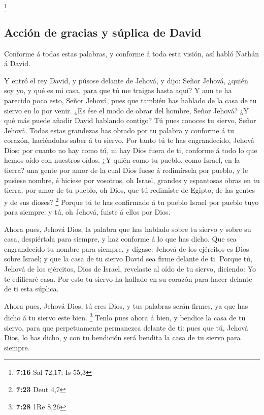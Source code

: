 \footnote{\textbf{7:16} Sal 72,17; Is 55,3}

\hypertarget{acciuxf3n-de-gracias-y-suxfaplica-de-david}{%
\subsection{Acción de gracias y súplica de
David}\label{acciuxf3n-de-gracias-y-suxfaplica-de-david}}

 Conforme á todas estas palabras, y conforme á toda esta
visión, así habló Nathán á David.

 Y entró el rey David, y púsose delante de Jehová, y
dijo: Señor Jehová, ¿quién soy yo, y qué es mi casa, para que tú me
traigas hasta aquí?  Y aun te ha parecido poco esto,
Señor Jehová, pues que también has hablado de la casa de tu siervo en lo
por venir. ¿Es ése el modo de obrar del hombre, Señor Jehová?
 ¿Y qué más puede añadir David hablando contigo? Tú pues
conoces tu siervo, Señor Jehová.  Todas estas grandezas
has obrado por tu palabra y conforme á tu corazón, haciéndolas saber á
tu siervo.  Por tanto tú te has engrandecido, Jehová
Dios: por cuanto no hay como tú, ni hay Dios fuera de ti, conforme á
todo lo que hemos oído con nuestros oídos.  ¿Y quién como
tu pueblo, como Israel, en la tierra? una gente por amor de la cual Dios
fuese á redimírsela por pueblo, y le pusiese nombre, é hiciese por
vosotros, oh Israel, grandes y espantosas obras en tu tierra, por amor
de tu pueblo, oh Dios, que tú redimiste de Egipto, de las gentes y de
sus dioses? \footnote{\textbf{7:23} Deut 4,7}  Porque tú
te has confirmado á tu pueblo Israel por pueblo tuyo para siempre: y tú,
oh Jehová, fuiste á ellos por Dios.

 Ahora pues, Jehová Dios, la palabra que has hablado
sobre tu siervo y sobre su casa, despiértala para siempre, y haz
conforme á lo que has dicho.  Que sea engrandecido tu
nombre para siempre, y dígase: Jehová de los ejércitos es Dios sobre
Israel; y que la casa de tu siervo David sea firme delante de ti.
 Porque tú, Jehová de los ejércitos, Dios de Israel,
revelaste al oído de tu siervo, diciendo: Yo te edificaré casa. Por esto
tu siervo ha hallado en su corazón para hacer delante de ti esta
súplica.

 Ahora pues, Jehová Dios, tú eres Dios, y tus palabras
serán firmes, ya que has dicho á tu siervo este bien. \footnote{\textbf{7:28}
  1Re 8,26}  Tenlo pues ahora á bien, y bendice la casa
de tu siervo, para que perpetuamente permanezca delante de ti: pues que
tú, Jehová Dios, lo has dicho, y con tu bendición será bendita la casa
de tu siervo para siempre.

